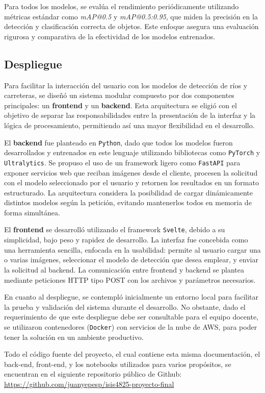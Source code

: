 Para todos los modelos, se evalúa el rendimiento periódicamente utilizando métricas estándar como \textit{mAP@0.5} y \textit{mAP@0.5:0.95}, que miden la precisión en la detección y clasificación correcta de objetos. Este enfoque asegura una evaluación rigurosa y comparativa de la efectividad de los modelos entrenados.

\subsection{Despliegue}

Para facilitar la interacción del usuario con los modelos de detección de ríos y carreteras, se diseñó un sistema modular compuesto por dos componentes principales: un \textbf{frontend} y un \textbf{backend}. Esta arquitectura se eligió con el objetivo de separar las responsabilidades entre la presentación de la interfaz y la lógica de procesamiento, permitiendo así una mayor flexibilidad en el desarrollo.

El \textbf{backend} fue planteado en \texttt{Python}, dado que todos los modelos fueron desarrollados y entrenados en este lenguaje utilizando bibliotecas como \texttt{PyTorch} y \texttt{Ultralytics}. Se propuso el uso de un framework ligero como \texttt{FastAPI} para exponer servicios web que reciban imágenes desde el cliente, procesen la solicitud con el modelo seleccionado por el usuario y retornen los resultados en un formato estructurado. La arquitectura considera la posibilidad de cargar dinámicamente distintos modelos según la petición, evitando mantenerlos todos en memoria de forma simultánea.

El \textbf{frontend} se desarrolló utilizando el framework \texttt{Svelte}, debido a su simplicidad, bajo peso y rapidez de desarrollo. La interfaz fue concebida como una herramienta sencilla, enfocada en la usabilidad: permite al usuario cargar una o varias imágenes, seleccionar el modelo de detección que desea emplear, y enviar la solicitud al backend. La comunicación entre frontend y backend se plantea mediante peticiones HTTP tipo POST con los archivos y parámetros necesarios.

En cuanto al despliegue, se contempló inicialmente un entorno local para facilitar la prueba y validación del sistema durante el desarrollo. No obstante, dado el requerimiento de que este despliegue debe ser consultable para el equipo docente, se utilizaron contenedores (\texttt{Docker}) con servicios de la nube de AWS, para poder tener la solución en un ambiente productivo.

Todo el código fuente del proyecto, el cual contiene esta misma documentación, el back-end, front-end, y los notebooks utilizados para varios propósitos, se encuentran en el siguiente repositorio público de Github: \href{https://github.com/juanyepesp/isis4825-proyecto-final}{https://github.com/juanyepesp/isis4825-proyecto-final}